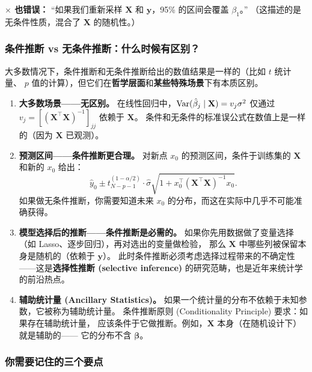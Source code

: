 \textbf{{\scriptsize $\times$} 也错误：}
``如果我们重新采样 $\mathbf{X}$ 和 $\mathbf{y}$，95\% 的区间会覆盖 $\beta_1$。''
（这描述的是无条件性质，混合了 $\mathbf{X}$ 的随机性。）

\subsubsection{条件推断 vs 无条件推断：什么时候有区别？}

大多数情况下，条件推断和无条件推断给出的数值结果是一样的（比如 $t$ 统计量、
$p$ 值的计算），但它们在\textbf{哲学层面}和\textbf{某些特殊场景}下有本质区别。

\begin{enumerate}[label=(\arabic*)]
    \item \textbf{大多数场景——无区别。}
    在线性回归中，$\mathrm{Var}(\hat{\beta}_j \mid \mathbf{X}) = v_j \sigma^2$ 仅通过
    $v_j = [(\mathbf{X}^\top \mathbf{X})^{-1}]_{jj}$ 依赖于 $\mathbf{X}$。
    条件和无条件的标准误公式在数值上是一样的（因为 $\mathbf{X}$ 已观测）。

    \item \textbf{预测区间——条件推断更合理。}
    对新点 $x_0$ 的预测区间，条件于训练集的 $\mathbf{X}$ 和新的 $x_0$ 给出：
    \[
        \hat{y}_0 \pm t_{N-p-1}^{(1-\alpha/2)} \cdot
        \hat{\sigma}\sqrt{1 + x_0^\top (\mathbf{X}^\top \mathbf{X})^{-1} x_0}.
    \]
    如果做无条件推断，你需要知道未来 $x_0$ 的分布，而这在实际中几乎不可能准确获得。

    \item \textbf{模型选择后的推断——条件推断是必需的。}
    如果你先用数据做了变量选择（如 Lasso、逐步回归），再对选出的变量做检验，
    那么 $\mathbf{X}$ 中哪些列被保留本身是随机的（依赖于 $\mathbf{y}$）。
    此时条件推断必须考虑选择过程带来的不确定性——这是\textbf{选择性推断
    (selective inference)} 的研究范畴，也是近年来统计学的前沿热点。

    \item \textbf{辅助统计量 (Ancillary Statistics)。}
    如果一个统计量的分布不依赖于未知参数，它被称为辅助统计量。
    条件推断原则 (Conditionality Principle) 要求：如果存在辅助统计量，
    应该条件于它做推断。例如，$\mathbf{X}$ 本身（在随机设计下）就是辅助的——
    它的分布不含 $\bm{\beta}$。
\end{enumerate}

\subsubsection{你需要记住的三个要点}

